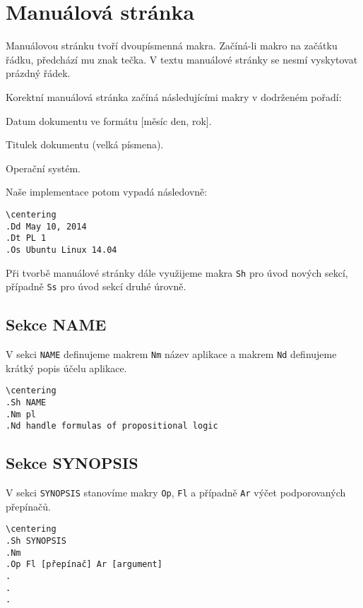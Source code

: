 \documentclass[thesis=B,czech,hidelinks]{FITthesis}[2012/06/26]
\begin{document}
\section{Manuálová stránka}

Manuálovou stránku tvoří dvoupísmenná makra. Začíná-li makro na začátku řádku, předchází mu znak tečka. V textu manuálové stránky se nesmí vyskytovat prázdný řádek.

Korektní manuálová stránka začíná následujícími makry v dodrženém pořadí:

\begin{description}
\centering
	\item[Dd] Datum dokumentu ve formátu [měsíc den, rok].
	\item[Dt] Titulek dokumentu (velká písmena).
	\item[Os] Operační systém.
\end{description}

Naše implementace potom vypadá následovně:

\begin{verbatim}
\centering
.Dd May 10, 2014
.Dt PL 1
.Os Ubuntu Linux 14.04
\end{verbatim}

Při tvorbě manuálové stránky dále využijeme makra \texttt{Sh} pro úvod nových sekcí, případně \texttt{Ss} pro úvod sekcí druhé úrovně.

\subsection{Sekce NAME}

V sekci \texttt{NAME} definujeme makrem \texttt{Nm} název aplikace a makrem \texttt{Nd} definujeme krátký popis účelu aplikace.

\begin{verbatim}
\centering
.Sh NAME
.Nm pl
.Nd handle formulas of propositional logic
\end{verbatim}

\subsection{Sekce SYNOPSIS}

V sekci \texttt{SYNOPSIS} stanovíme makry \texttt{Op}, \texttt{Fl} a případně \texttt{Ar} výčet podporovaných přepínačů.

\begin{verbatim}
\centering
.Sh SYNOPSIS
.Nm
.Op Fl [přepínač] Ar [argument]
.
.
.
\end{verbatim}
\end{document}
